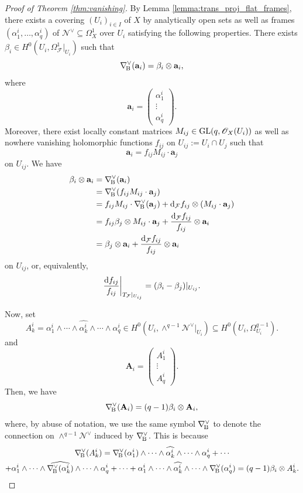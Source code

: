 \documentclass[english,10pt]{amsart}
\newcommand{\nablaBott}{\nabla_{\! \textup{B}}}
\newcommand{\cF}{\mathcal{F}}
\newcommand{\sF}{\mathscr{F}}
\newcommand{\sN}{\mathscr{N}}
\newcommand{\sO}{\mathscr{O}}
\newcommand{\dd}{\textup{d}}
\theoremstyle{definition}
\theoremstyle{remark}
\numberwithin{equation}{section}
\begin{document}
\begin{proof}[Proof of Theorem \ref{thm:vanishing}] By Lemma \ref{lemma:trans_proj_flat_frames}, there exists a covering $(U_i)_{i \in I}$ of $X$ by analytically open sets as well as frames $(\alpha_1^i,\ldots,\alpha_q^i)$ of $\sN^\vee\subseteq \Omega_X^1$ over $U_i$ satisfying the following properties. There exists $\beta_i\in H^0(U_i,\Omega^1_{\sF}|_{U_i})$ such that
\[
\nablaBott^\vee(\textbf{a}_i)=\beta_i\otimes \textbf{a}_i,
\]
where 
\[
\textbf{a}_i = 
\begin{pmatrix}
\alpha_1^i \\
\vdots \\
\alpha_q^i
\end{pmatrix}
.
\]
Moreover, there exist locally constant matrices $M_{ij} \in \textup{GL}(q,\sO_X(U_i))$ as well as nowhere vanishing holomorphic functions $f_{ij}$ on $U_{ij}:=U_i\cap U_j$ such that 
\[
\textbf{a}_i= f_{ij} M_{ij} \cdot \textbf{a}_j
\]
on $U_{ij}$. We have
\begin{align*}
\beta_i\otimes \textbf{a}_i & =  \nablaBott^\vee(\textbf{a}_i) \\
& = \nablaBott^\vee(f_{ij} M_{ij} \cdot \textbf{a}_j)\\
& =  f_{ij} M_{ij} \cdot  \nablaBott^\vee(\textbf{a}_j) + \dd_\cF f_{ij} \otimes (M_{ij} \cdot \textbf{a}_j) \\
& =  f_{ij} \beta_j \otimes M_{ij} \cdot \textbf{a}_j + \frac{\dd_\cF f_{ij}}{f_{ij}} \otimes \textbf{a}_i \\
& =  \beta_j \otimes \textbf{a}_i + \frac{\dd_\cF f_{ij}}{f_{ij}} \otimes \textbf{a}_i 
\end{align*}
on $U_{ij}$, or, equivalently,
\begin{equation}\label{eq:beta}
{\frac{\dd f_{ij}}{f_{ij}}}\bigg|_{T_{\cF}|_{U_{ij}}}=(\beta_i-\beta_j)|_{U_{ij}}.
\end{equation}

Now, set 
\[
A_k^i=\alpha_1^i \wedge \cdots \wedge \widehat{\alpha_k^i} \wedge \cdots \wedge \alpha_q^i \in H^0(U_i,\wedge^{q-1} \sN^\vee|_{U_i}) \subseteq H^0(U_i,\Omega_{U_i}^{q-1}).
\]
and 
\[
\textbf{A}_i = 
\begin{pmatrix}
A_1^i \\
\vdots \\
A_q^i
\end{pmatrix}
.
\]
Then, we have
\[
\nablaBott^\vee(\textbf{A}_i) = (q-1)\beta_i \otimes \textbf{A}_i,
\] 
where, by abuse of notation, we use the same symbol $\nablaBott^\vee$ to denote the connection on $\wedge^{q-1}\sN^\vee$ induced by $\nablaBott^\vee$. This is because
\begin{multline*}
\nablaBott^\vee(A_k^i)=\nablaBott^\vee(\alpha_1^i) \wedge \cdots \wedge \widehat{\alpha_k^i} \wedge \cdots \wedge \alpha_q^i+\cdots \\ +\alpha_1^i \wedge \cdots \wedge \widehat{\nablaBott^\vee(\alpha_k^i)} \wedge \cdots \wedge \alpha_q^i+\cdots +
\alpha_1^i \wedge \cdots \wedge \widehat{\alpha_k^i} \wedge \cdots \wedge \nablaBott^\vee(\alpha_q^i) = (q-1) \beta_i \otimes A_k^i.
\end{multline*}


\end{proof}
\end{document}
